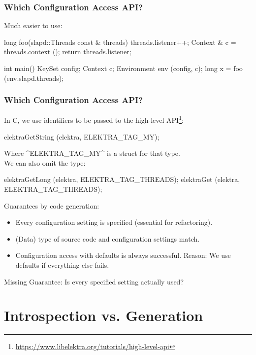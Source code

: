 \begin{frame}[fragile]
	\frametitle{Which Configuration Access API?}

	Much easier to use:
	\begin{code}[gobble=4,language=Cpp]
	long foo(slapd::Threads const & threads)
	{
		threads.listener++;
		Context & c = threads.context ();
		return threads.listener;
	}

	int main()
	{
		KeySet config;
		Context c;
		Environment env (config, c);
		long x = foo (env.slapd.threads);
	}
	\end{code}
\end{frame}

\begin{frame}[fragile]
	\frametitle{Which Configuration Access API?}

	In C, we use identifiers to be passed to the high-level API\footnote{\url{https://www.libelektra.org/tutorials/high-level-api}}:
	\\[2em]
	\begin{code}[gobble=4,language=Cpp]
	elektraGetString (elektra, ELEKTRA_TAG_MY);
	\end{code}
	Where ^ELEKTRA_TAG_MY^ is a struct for that type.
	\\[2em]

	We can also omit the type:
	\begin{code}[gobble=4,language=Cpp]
	elektraGetLong (elektra, ELEKTRA_TAG_THREADS);
	elektraGet (elektra, ELEKTRA_TAG_THREADS);
	\end{code}
\end{frame}

\begin{frame}
	Guarantees by code generation:
	\begin{itemize}
	\item Every configuration setting is specified (essential for refactoring).
	\item (Data) type of source code and configuration settings match.
	\item Configuration access with defaults is always successful.
	Reason: We use defaults if everything else fails.
	\end{itemize}
	\vspace{3em}
	Missing Guarantee: Is every specified setting actually used?
\end{frame}



\section{Introspection vs. Generation}

